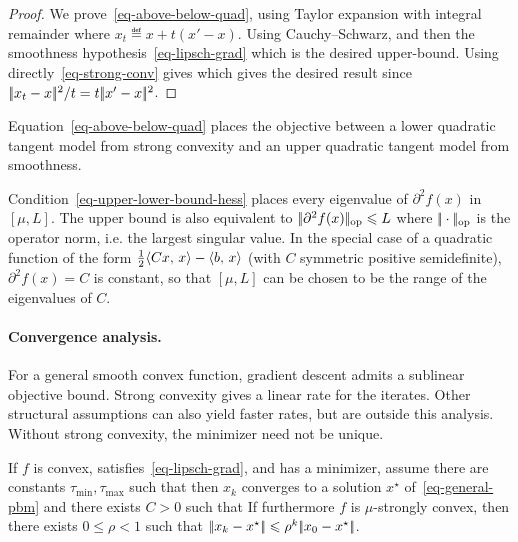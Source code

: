 \begin{proof}
	We prove~\eqref{eq-above-below-quad}, using Taylor expansion with integral remainder
	where $x_t \eqdef x+t(x'-x)$.
	Using Cauchy--Schwarz, and then the smoothness hypothesis~\eqref{eq-lipsch-grad}
	which is the desired upper-bound. Using directly~\eqref{eq-strong-conv} gives 
	which gives the desired result since $|\!| x_t-x |\!|^2 / t = t |\!| x'-x |\!|^2$.
\end{proof}

Equation~\eqref{eq-above-below-quad} places the objective between a lower quadratic tangent model from strong convexity and an upper quadratic tangent model from smoothness.

Condition~\eqref{eq-upper-lower-bound-hess} places every eigenvalue of $\partial^2 f(x)$ in $[\mu,L]$. The upper bound is also equivalent to $|\!| \partial^2 f(x) |\!|_{\text{op}} \leqslant L$ where $|\!| \cdot |\!|_{\text{op}}$ is the operator norm, i.e. the largest singular value.
%
In the special case of a quadratic function of the form $\frac12\langle Cx,\,x\rangle-\langle b,\,x\rangle$ (with $C$ symmetric positive semidefinite), $\partial^2 f(x)=C$ is constant, so that $[\mu,L]$ can be chosen to be the range of the eigenvalues of $C$.

\paragraph{Convergence analysis.}

For a general smooth convex function, gradient descent admits a sublinear objective bound. Strong convexity gives a linear rate for the iterates. Other structural assumptions can also yield faster rates, but are outside this analysis.
%
Without strong convexity, the minimizer need not be unique.

\begin{thm}\label{thm-gradsec-non-strong-conv}\label{thm-gradsec-strong-conv}
	If $f$ is convex, satisfies~\eqref{eq-lipsch-grad}, and has a minimizer, assume there are constants $\tau_{\min},\tau_{\max}$ such that
	then $x_k$ converges to a solution $x^\star$ of~\eqref{eq-general-pbm} and
	there exists $C>0$ such that 
	If furthermore $f$ is $\mu$-strongly convex, then there exists $0 \leq \rho < 1$ such that $|\!| x_k-x^\star |\!| \leqslant \rho^k |\!| x_0-x^\star |\!|$.
\end{thm}


